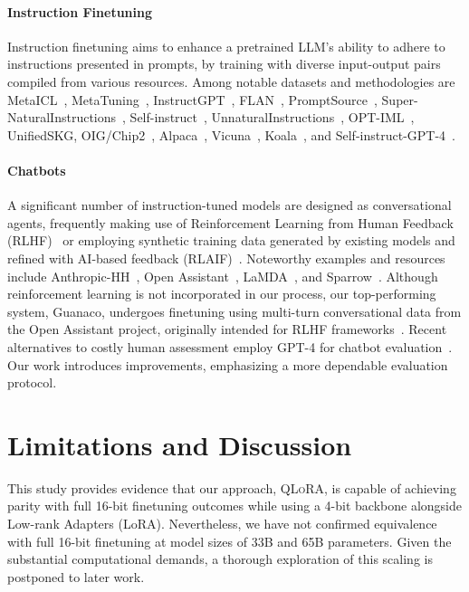 \paragraph{Instruction Finetuning} Instruction finetuning aims to enhance a pretrained LLM’s ability to adhere to instructions presented in prompts, by training with diverse input-output pairs compiled from various resources. Among notable datasets and methodologies are MetaICL~\citep{min2021metaicl}, MetaTuning~\citep{zhong2021adapting}, InstructGPT~\citep{ouyang2022training}, FLAN~\citep{wei2021finetuned,chung2022scaling}, PromptSource~\citep{bach2022promptsource}, Super-NaturalInstructions~\citep{wang2022super,sanh2021multitask}, Self-instruct~\citep{wang2022self}, UnnaturalInstructions~\citep{honovich2022unnatural}, OPT-IML~\citep{iyer2022opt}, UnifiedSKG\citep{xie2022unifiedskg}, OIG/Chip2~\citep{laion2023}, Alpaca~\citep{alpaca}, Vicuna~\citep{vicuna2023}, Koala~\citep{koala_blogpost_2023}, and Self-instruct-GPT-4~\citep{peng2023instruction}.

\paragraph{Chatbots} A significant number of instruction-tuned models are designed as conversational agents, frequently making use of Reinforcement Learning from Human Feedback (RLHF)~\citep{christiano2017deep} or employing synthetic training data generated by existing models and refined with AI-based feedback (RLAIF)~\citep{bai2022constitutional}. Noteworthy examples and resources include Anthropic-HH~\citep{askell2021general,bai2022training}, Open Assistant~\citep{kopf2023openassistant}, LaMDA~\citep{thoppilan2022lamda}, and Sparrow~\citep{glaese2022improving}. Although reinforcement learning is not incorporated in our process, our top-performing system, Guanaco, undergoes finetuning using multi-turn conversational data from the Open Assistant project, originally intended for RLHF frameworks~\citep{kopf2023openassistant}. Recent alternatives to costly human assessment employ GPT-4 for chatbot evaluation~\citep{vicuna2023,peng2023instruction}. Our work introduces improvements, emphasizing a more dependable evaluation protocol.

\section{Limitations and Discussion}

This study provides evidence that our approach, \textsc{QLoRA}, is capable of achieving parity with full 16-bit finetuning outcomes while using a 4-bit backbone alongside Low-rank Adapters (LoRA). Nevertheless, we have not confirmed equivalence with full 16-bit finetuning at model sizes of 33B and 65B parameters. Given the substantial computational demands, a thorough exploration of this scaling is postponed to later work.


